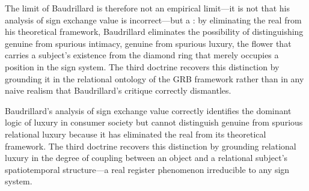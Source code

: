 The limit of Baudrillard is therefore not an empirical limit---it is not that his analysis of sign exchange value is incorrect---but a : by eliminating the real from his theoretical framework, Baudrillard eliminates the possibility of distinguishing genuine from spurious intimacy, genuine from spurious luxury, the flower that carries a subject's existence from the diamond ring that merely occupies a position in the sign system. The third doctrine recovers this distinction by grounding it in the relational ontology of the GRB framework rather than in any naive realism that Baudrillard's critique correctly dismantles.

\begin{claim}
Baudrillard's analysis of sign exchange value correctly identifies the dominant logic of luxury in consumer society but cannot distinguish genuine from spurious relational luxury because it has eliminated the real from its theoretical framework. The third doctrine recovers this distinction by grounding relational luxury in the degree of coupling between an object and a relational subject's spatiotemporal structure---a real register phenomenon irreducible to any sign system.
\end{claim}
